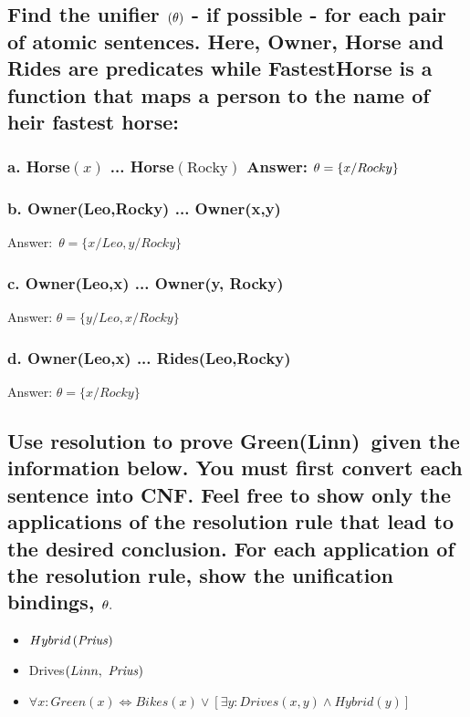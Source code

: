 \documentclass{article}
\begin{document}
\subsection{Find the unifier $\left( \protect\theta \right) $ - if possible
- for each pair of atomic sentences. Here, Owner, Horse and Rides are
predicates while FastestHorse is a function that maps a person to the name
of heir fastest horse:}

\subsubsection{a. Horse$\left( x\right) $ ... Horse$\left( \text{Rocky}%
\right) $ Answer: $\protect\theta =\{x/Rocky\}$}

\subsubsection{b. Owner(Leo,Rocky) ... Owner(x,y)}

Answer:\ $\theta =\{x/Leo,y/Rocky\}$

\subsubsection{c. Owner(Leo,x) ... Owner(y, Rocky)}

Answer: $\theta =\{y/Leo,x/Rocky\}$

\subsubsection{d. Owner(Leo,x) ... Rides(Leo,Rocky)}

Answer: $\theta =\{x/Rocky\}$

\subsection{Use resolution to prove Green(Linn)\ given the information
below. You must first convert each sentence into CNF. Feel free to show only
the applications of the resolution rule that lead to the desired conclusion.
For each application of the resolution rule, show the unification bindings, $%
\protect\theta .$}

\begin{itemize}
\item $Hybrid\left( \text{\textit{Prius}}\right) $

\item Drives$\left( Linn,\text{ \textit{Prius}}\right) $

\item $\forall x:Green\left( x\right) \Leftrightarrow Bikes\left( x\right)
\vee \left[ \exists y:Drives\left( x,y\right) \wedge Hybrid\left( y\right) %
\right] $
\end{itemize}
\end{document}
